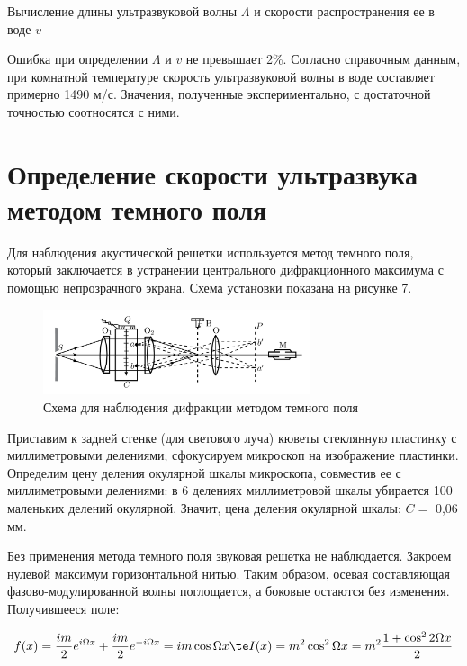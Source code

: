 \documentclass[12pt]{kiarticle} %
\begin{document}
	\begin{table}[h!]
	\centering
	
	\caption{Вычисление длины ультразвуковой волны $ \Lambda $ и скорости распространения ее в воде $ v $}
	\label{speed}
\end{table}	

\newpage

Ошибка при определении $ \Lambda $ и $ v $ не превышает 2\%. Согласно справочным данным, при комнатной температуре скорость ультразвуковой волны в воде составляет примерно 1490 м/с. Значения, полученные экспериментально, с достаточной точностью соотносятся с ними.

\newpage

\section{Определение скорости ультразвука методом темного поля}

Для наблюдения акустической решетки используется метод темного поля, который заключается в устранении центрального дифракционного максимума с помощью непрозрачного экрана. Схема установки показана на рисунке 7.

	\begin{figure}[h!]
	\centering	
	\includegraphics[width=0.7\textwidth]{shema2.png}
	\caption{Схема для наблюдения дифракции методом темного поля}
	\label{shema2}
\end{figure}

Приставим к задней стенке (для светового луча) кюветы стеклянную пластинку с миллиметровыми делениями; сфокусируем микроскоп на изображение пластинки. Определим цену деления окулярной шкалы микроскопа, совместив ее с миллиметровыми делениями: в 6 делениях миллиметровой шкалы убирается 100 маленьких делений окулярной. Значит, цена деления окулярной шкалы: $ C = $ 0,06 мм.

Без применения метода темного поля звуковая решетка не наблюдается. Закроем нулевой максимум горизонтальной нитью. Таким образом, осевая составляющая фазово-модулированной волны поглощается, а боковые остаются без изменения. Получившееся поле: 

\begin{equation}\label{}
f(x) = \dfrac{im}{2} e^{i\Omega x} +  \dfrac{im}{2} e^{-i\Omega x} = im \cos \Omega x \te I(x) = m^2 \cos ^2 \Omega x = m^2 \dfrac{1 + \cos ^2 2 \Omega x}{2}
\end{equation}
\end{document}
